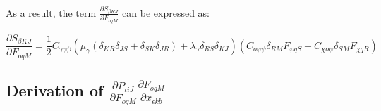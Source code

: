 \documentclass[oneside,11pt,times]{book}
\newcommand\omicron{o}
\begin{document}
As a result, the term  $\frac{{\partial S_{ \beta KJ}}}{{\partial F_{ \omicron qM}}}$ can be expressed as:

\begin{equation}
\frac{\partial S_{ \beta KJ}}{\partial F_{ \omicron qM}} = \frac{1}{2}C_{\gamma \psi \beta} \left(\mu_{\gamma}\left(\delta_{KR}\delta_{JS}+ \delta_{SK}\delta_{JR}\right) + \lambda_{\gamma} \delta_{RS}\delta_{KJ}\right)\left(C_{\omicron \varphi \psi}\delta_{RM} F_{\varphi qS} + C_{\chi \omicron \psi}\delta_{SM}F_{ \chi qR}\right)
\end{equation}

\subsection{ Derivation of $\frac{\partial P_{ \iota iJ}}{\partial F_{ \omicron qM}} \frac{\partial F_{ \omicron qM}}{\partial x_{ \epsilon kb}}$ }
\end{document}
